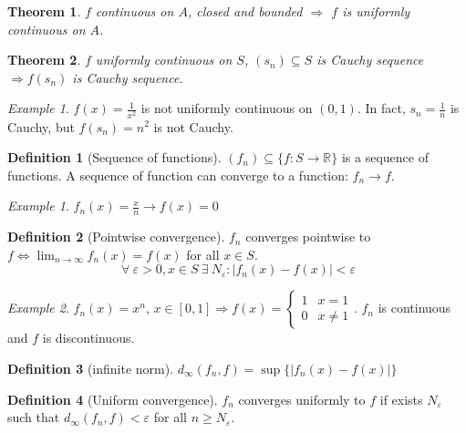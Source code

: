 \documentclass{article}
\newcommand{\DS}{\displaystyle}
\newcommand{\abs}[1]{\left|#1\right|}
\newcommand{\Ar}{\Rightarrow}
\newcommand{\f}[3]{#1 : #2 \rightarrow #3}
\newcommand{\intcc}[1]{\left[#1\right]}
\newcommand{\limn}{\lim_{n \to \infty}}
\theoremstyle{definition}
\newtheorem{definition}{Definition}[section]
\theoremstyle{definition}
\theoremstyle{plain}
\newtheorem{theorem}{Theorem}[section]
\theoremstyle{plain}
\theoremstyle{plain}
\theoremstyle{plain}
\theoremstyle{definition}
\theoremstyle{remark}
\newtheorem{exampled}{Example}[definition]
\theoremstyle{remark}
\theoremstyle{remark}
\newtheorem{examplet}{Example}[theorem]
\theoremstyle{remark}
\newcommand{\R}{\mathbb{R}}
\newcommand{\ForAll}{\ \forall \ }
\newcommand{\Exists}{\ \exists \ }
\newcommand{\E}{\varepsilon}
\begin{document}
\begin{theorem}
  $f$ continuous on $A$, closed and bounded $\Ar$ $f$ is uniformly continuous on $A$.
\end{theorem}


\begin{theorem}
  $f$ uniformly continuous on $S$, $(s_n) \subseteq S$ is Cauchy sequence $\Ar f(s_n)$ is Cauchy sequence.
\end{theorem}


\begin{examplet}
  $f(x) = \frac{1}{x^2}$ is not uniformly continuous on $(0,1)$. In fact, $s_n = \frac{1}{n}$ is Cauchy, but $f(s_n) = n^2$ is not Cauchy.
\end{examplet}


\begin{definition}[Sequence of functions]
  $(f_n) \subseteq \{ \f{f}{S}{\R} \}$ is a sequence of functions. A sequence of function can converge to a function: $f_n \to f$.
\end{definition}

\begin{exampled}
  $f_n(x) = \frac{x}{n} \to f(x) = 0$
\end{exampled}


\begin{definition}[Pointwise convergence]
  $f_n$ converges pointwise to $f \iff \DS \limn{f_n(x)} = f(x)$ for all $x \in S$.
  \[
  \ForAll \E > 0, x \in S \Exists N_\E : \abs{f_n(x) - f(x)} < \E
  \]
\end{definition}

\begin{exampled}
  $f_n(x) = x^n$, $x \in \intcc{0,1} \Ar f(x) = \begin{cases}1 & x = 1 \\ 0 & x \neq 1\end{cases}$. $f_n$ is continuous and $f$ is discontinuous.
\end{exampled}


\begin{definition}[infinite norm]
  $d_\infty(f_n,f) = \sup \{ \abs{f_n(x) - f(x)} \}$
\end{definition}


\begin{definition}[Uniform convergence]
  $f_n$ converges uniformly to $f$ if exists $N_\E$ such that $d_\infty(f_n,f) < \E$ for all $n \geq N_\E$.
\end{definition}
\end{document}
